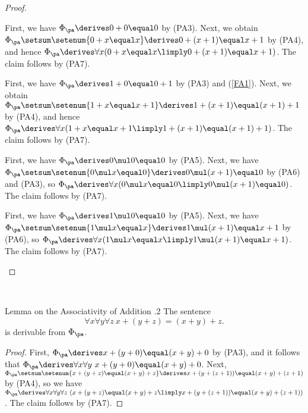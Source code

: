\begin{proof}
\begin{inparaenum}[(a)]
%
\item First, we have $\Phi_\pa \derives 0 + 0 \equal 0$ by (PA3). Next, we obtain $\Phi_\pa \setsum \setenum{0 + x \equal x} \derives 0 + (x + 1) \equal x + 1$ by (PA4), and hence $\Phi_\pa \derives \forall x (0 + x \equal x \limply 0 + (x + 1) \equal x + 1)$. The claim follows by (PA7).\medskip\\
%
\item First, we have $\Phi_\pa \derives 1 + 0 \equal 0 + 1$ by (PA3) and (\ref{FA1}). Next, we obtain $\Phi_\pa \setsum \setenum{1 + x \equal x + 1} \derives 1 + (x + 1) \equal (x + 1) + 1$ by (PA4), and hence $\Phi_\pa \derives \forall x (1 + x \equal x + 1 \limply 1 + (x + 1) \equal (x + 1) + 1)$. The claim follows by (PA7).\medskip\\
%
\item First, we have $\Phi_\pa \derives 0 \mul 0 \equal 0$ by (PA5). Next, we have $\Phi_\pa \setsum \setenum{0 \mul x \equal 0} \derives 0 \mul (x + 1) \equal 0$ by (PA6) and (PA3), so $\Phi_\pa \derives \forall x (0 \mul x \equal 0 \limply 0 \mul (x + 1) \equal 0)$. The claim follows by (PA7).\medskip\\
%
\item First, we have $\Phi_\pa \derives 1 \mul 0 \equal 0$ by (PA5). Next, we have $\Phi_\pa \setsum \setenum{1 \mul x \equal x} \derives 1 \mul (x + 1) \equal x + 1$ by (PA6), so $\Phi_\pa \derives \forall x (1 \mul x \equal x \limply 1 \mul (x + 1) \equal x + 1)$. The claim follows by (PA7).
%
\end{inparaenum}
\end{proof}\ \medskip\\
\begin{theorem}{Lemma on the Associativity of Addition \thesection.2} The sentence
\[
\forall x \forall y \forall z \ x + (y + z) \equal (x + y) + z.
\]
is derivable from $\Phi_\pa$.
\end{theorem}
\begin{proof}
First, $\Phi_\pa \derives x + (y + 0) \equal (x + y) + 0$ by (PA3), and it follows that $\Phi_\pa \derives \forall x \forall y \ x + (y + 0) \equal (x + y) + 0$. Next, $\Phi_\pa \setsum \setenum{x + (y + z) \equal (x + y) + z} \derives x + (y + (z + 1)) \equal (x + y) + (z + 1)$ by (PA4), so we have $\Phi_\pa \derives \forall x \forall y \forall z \ (x + (y + z) \equal (x + y) + z \limply x + (y + (z + 1)) \equal (x + y) + (z + 1))$. The claim follows by (PA7).
\end{proof}\ \medskip\\
